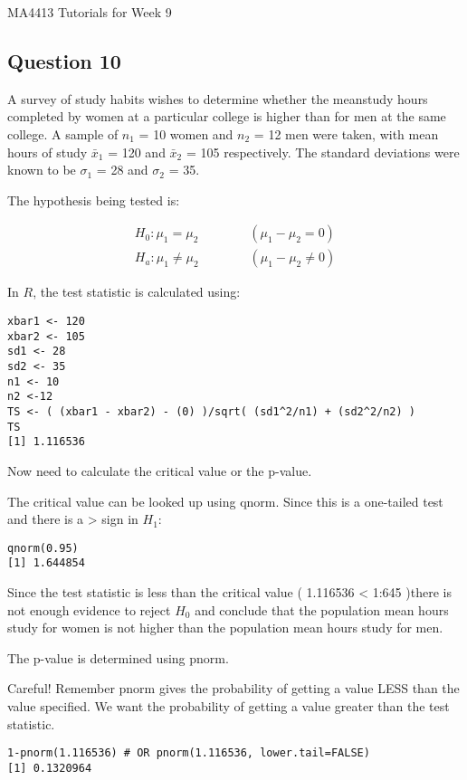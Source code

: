 \documentclass[]{report}
\begin{document}


MA4413 Tutorials for Week 9




\subsection*{Question 10} 
A survey of study habits wishes to determine whether the meanstudy hours completed by women at a particular college is higher
than for men at the same college. A sample of $n_1$ = 10 women and
$n_2$ = 12 men were taken, with mean hours of study $\bar{x}_1$ =
120 and $\bar{x}_2$ = 105 respectively. The standard deviations
were known to be $\sigma_1$ = 28 and $\sigma_2$ = 35.

The hypothesis being tested is:

\begin{eqnarray}
H_{0}: \mu_1 = \mu_2\qquad \qquad (\mu_1 - \mu_2= 0)\\
H_{a}: \mu_1 \neq \mu_2 \qquad \qquad (\mu_1 - \mu_2 \neq 0)
\end{eqnarray}

In $R$, the test statistic is calculated using:

\begin{verbatim}
xbar1 <- 120
xbar2 <- 105
sd1 <- 28
sd2 <- 35
n1 <- 10
n2 <-12
TS <- ( (xbar1 - xbar2) - (0) )/sqrt( (sd1^2/n1) + (sd2^2/n2) )
TS
[1] 1.116536
\end{verbatim}
Now need to calculate the critical value or the p-value.


The critical value can be looked up using qnorm. Since this is a
one-tailed test and there is a > sign in $H_1$:

\begin{verbatim}
qnorm(0.95)
[1] 1.644854
\end{verbatim}

Since the test statistic is less than the critical value ( 1.116536 < 1:645 )there is not enough evidence to reject $H_0$
and conclude that the population mean hours study for women is
not higher than the population mean hours study for men.


The p-value is determined using pnorm.

Careful! Remember pnorm
gives the probability of getting a value LESS than the value specified. We want the probability of getting a value greater than
the test statistic.
\begin{verbatim}
1-pnorm(1.116536) # OR pnorm(1.116536, lower.tail=FALSE)
[1] 0.1320964
\end{verbatim}
\end{document}
